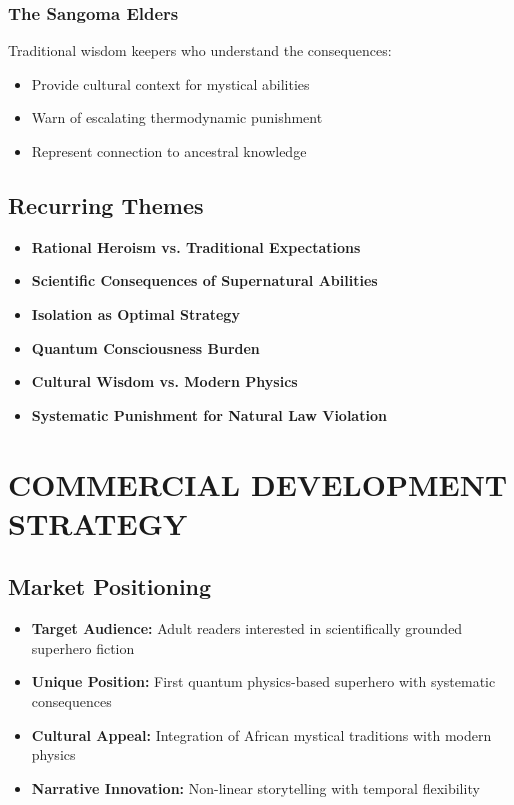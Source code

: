 \documentclass[12pt,a4paper]{article}
\begin{document}
\subsubsection{The Sangoma Elders}
Traditional wisdom keepers who understand the consequences:
\begin{itemize}
\item Provide cultural context for mystical abilities
\item Warn of escalating thermodynamic punishment
\item Represent connection to ancestral knowledge
\end{itemize}

\subsection{Recurring Themes}
\begin{itemize}
\item \textbf{Rational Heroism vs. Traditional Expectations}
\item \textbf{Scientific Consequences of Supernatural Abilities}
\item \textbf{Isolation as Optimal Strategy}
\item \textbf{Quantum Consciousness Burden}
\item \textbf{Cultural Wisdom vs. Modern Physics}
\item \textbf{Systematic Punishment for Natural Law Violation}
\end{itemize}

\section{COMMERCIAL DEVELOPMENT STRATEGY}

\subsection{Market Positioning}
\begin{itemize}
\item \textbf{Target Audience:} Adult readers interested in scientifically grounded superhero fiction
\item \textbf{Unique Position:} First quantum physics-based superhero with systematic consequences
\item \textbf{Cultural Appeal:} Integration of African mystical traditions with modern physics
\item \textbf{Narrative Innovation:} Non-linear storytelling with temporal flexibility
\end{itemize}
\end{document}
